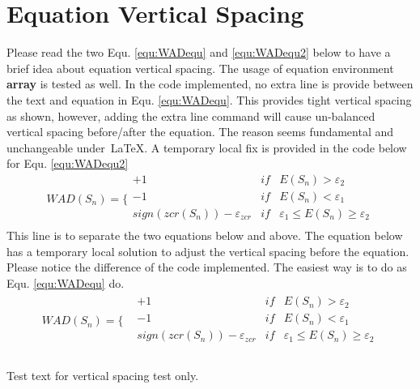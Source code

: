 \section{Equation Vertical Spacing}
Please read the two Equ. \eqref{equ:WADequ} and \eqref{equ:WADequ2} below to have a brief idea about equation vertical spacing. The usage of equation environment \textbf{array} is tested as well. In the code implemented, no extra line is provide between the text and equation in Equ. \eqref{equ:WADequ}. This provides tight vertical spacing as shown, however, adding the extra line command will cause un-balanced vertical spacing before/after the equation. The reason seems fundamental and unchangeable under~\LaTeX. A temporary local fix is provided in the code below for Equ. \eqref{equ:WADequ2}
\begin{equation}
WAD(S_{n}) = \Bigg\{ 
\begin{array}{ccc}
+1 & if &  E(S_{n}) >  \varepsilon_{2}      	\\
-1 & if &  E(S_{n}) < \varepsilon_{1}       \\
sign(zcr(S_n)) - \varepsilon_{zcr} & if &  \varepsilon_{1} \le E(S_{n}) \ge \varepsilon_{2}       \\
\end{array}
\label{equ:WADequ}
\end{equation}
This line is to separate the two equations below and above. The equation below has a temporary local solution to adjust the vertical spacing before the equation. Please notice the difference of the code implemented. The easiest way is to do as Equ. \eqref{equ:WADequ} do.
\\[-2ex]	%
\begin{align}
WAD(S_{n}) = \Bigg\{ 	& %
\begin{array}{ccc}
+1 & if &  E(S_{n}) >  \varepsilon_{2}      	\\
-1 & if &  E(S_{n}) < \varepsilon_{1}       \\
sign(zcr(S_n)) - \varepsilon_{zcr} & if &  \varepsilon_{1} \le E(S_{n}) \ge \varepsilon_{2}       \\
\end{array}
\label{equ:WADequ2}
\end{align}
\\
Test text for vertical spacing test only.

